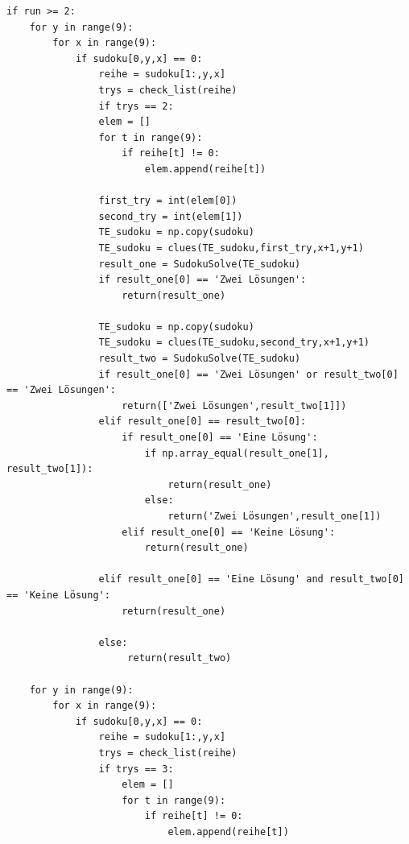 \documentclass[11pt,a4paper]{article}
\begin{document}
\begin{verbatim}
if run >= 2:
    for y in range(9):       
        for x in range(9):            
            if sudoku[0,y,x] == 0:       
                reihe = sudoku[1:,y,x]    
                trys = check_list(reihe) 
                if trys == 2:            
                elem = []                    
                for t in range(9):            
                    if reihe[t] != 0:         
                        elem.append(reihe[t]) 
                                    
                first_try = int(elem[0])      
                second_try = int(elem[1])     
                TE_sudoku = np.copy(sudoku)   
                TE_sudoku = clues(TE_sudoku,first_try,x+1,y+1) 
                result_one = SudokuSolve(TE_sudoku)  
                if result_one[0] == 'Zwei Lösungen': 
                    return(result_one)               
                
                TE_sudoku = np.copy(sudoku)                     
                TE_sudoku = clues(TE_sudoku,second_try,x+1,y+1) 
                result_two = SudokuSolve(TE_sudoku)             
                if result_one[0] == 'Zwei Lösungen' or result_two[0] == 'Zwei Lösungen':
                    return(['Zwei Lösungen',result_two[1]])                                
                elif result_one[0] == result_two[0]:                                     
                    if result_one[0] == 'Eine Lösung':                   
                        if np.array_equal(result_one[1], result_two[1]): 
                            return(result_one)                           
                        else:                                            
                            return('Zwei Lösungen',result_one[1])        
                    elif result_one[0] == 'Keine Lösung':                
                        return(result_one)                               
                            
                elif result_one[0] == 'Eine Lösung' and result_two[0] == 'Keine Lösung': 
                    return(result_one)                                                   
                
                else:                                                                    
                     return(result_two)                                                   
           
    for y in range(9):                 
        for x in range(9):        
            if sudoku[0,y,x] == 0:           
                reihe = sudoku[1:,y,x]       
                trys = check_list(reihe)     
                if trys == 3:               
                    elem = []                     
                    for t in range(9):             
                        if reihe[t] != 0:          
                            elem.append(reihe[t]) 
                                    

\end{verbatim}
\end{document}
